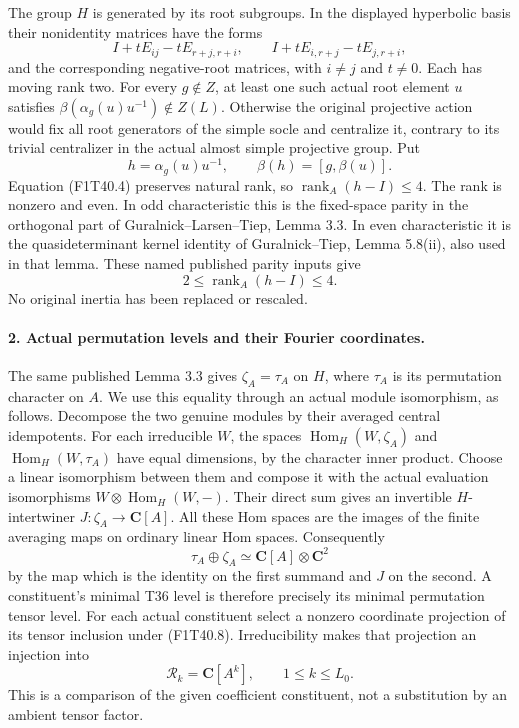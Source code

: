 The group \(H\) is generated by its root subgroups.
In the displayed hyperbolic basis their nonidentity
matrices have the forms
\[
 I+tE_{ij}-tE_{r+j,r+i},\qquad
 I+tE_{i,r+j}-tE_{j,r+i},
 \tag{F1T40.5}
\]
and the corresponding negative-root matrices, with
\(i\ne j\) and \(t\ne0\). Each has moving rank two.
For every \(g\notin Z\), at least one such actual
root element \(u\) satisfies
\(\beta(\alpha_g(u)u^{-1})\notin Z(L)\).
Otherwise the original projective action would fix all
root generators of the simple socle and centralize it,
contrary to its trivial centralizer in the actual almost
simple projective group. Put
\[
 h=\alpha_g(u)u^{-1},\qquad
 \beta(h)=[g,\beta(u)].
 \tag{F1T40.6}
\]
Equation (F1T40.4) preserves natural rank, so
\(\operatorname{rank}_A(h-I)\le4\).
The rank is nonzero and even. In odd characteristic this
is the fixed-space parity in the orthogonal part of
Guralnick--Larsen--Tiep, Lemma 3.3. In even characteristic
it is the quasideterminant kernel identity of
Guralnick--Tiep, Lemma 5.8(ii), also used in that lemma.
These named published parity inputs give
\[
                  2\le\operatorname{rank}_A(h-I)\le4.
 \tag{F1T40.7}
\]
No original inertia has been replaced or rescaled.

\paragraph{2. Actual permutation levels and their Fourier coordinates.}
The same published Lemma 3.3 gives
\(\zeta_A=\tau_A\) on \(H\), where \(\tau_A\) is
its permutation character on \(A\). We use this equality
through an actual module isomorphism, as follows.
Decompose the two genuine modules by their averaged
central idempotents. For each irreducible \(W\), the
spaces \(\operatorname{Hom}_H(W,\zeta_A)\) and
\(\operatorname{Hom}_H(W,\tau_A)\) have equal dimensions,
by the character inner product. Choose a linear isomorphism
between them and compose it with the actual evaluation
isomorphisms \(W\otimes\operatorname{Hom}_H(W,-)\).
Their direct sum gives an invertible \(H\)-intertwiner
\(J:\zeta_A\longrightarrow\mathbf C[A]\).
All these Hom spaces are the images of the finite averaging
maps on ordinary linear Hom spaces. Consequently
\[
 \tau_A\oplus\zeta_A\simeq\mathbf C[A]\otimes\mathbf C^2
 \tag{F1T40.8}
\]
by the map which is the identity on the first summand and
\(J\) on the second. A constituent's minimal T36 level
is therefore precisely its minimal permutation tensor level.
For each actual constituent select a nonzero coordinate
projection of its tensor inclusion under (F1T40.8).
Irreducibility makes that projection an injection into
\[
          \mathcal R_k=\mathbf C[A^k],\qquad
                    1\le k\le L_0.
 \tag{F1T40.9}
\]
This is a comparison of the given coefficient constituent,
not a substitution by an ambient tensor factor.

